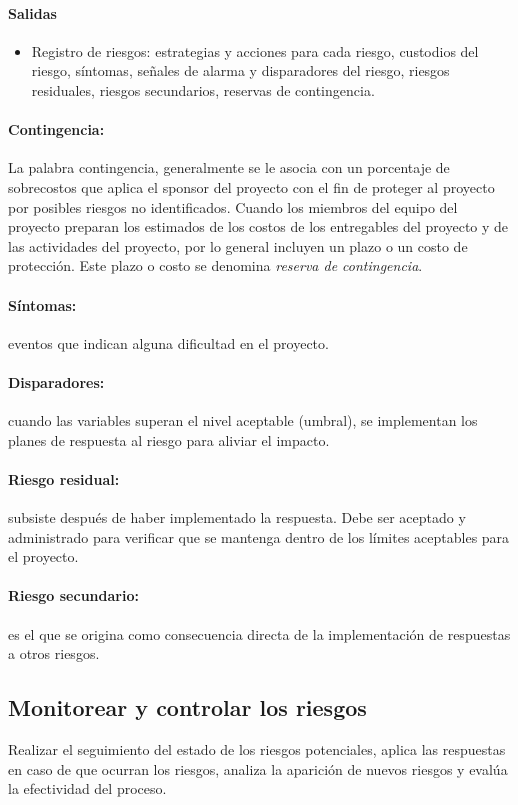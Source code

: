\documentclass[a4paper,twosides]{article}
\newlength{\wideitemsep}
\let\olditem\item
\renewcommand{\item}{\setlength{\itemsep}{\wideitemsep}\olditem}
\begin{document}
\paragraph{Salidas}
\begin{itemize}
\item Registro de riesgos: estrategias y acciones para cada riesgo, custodios del riesgo, síntomas, señales de alarma y disparadores del riesgo, riesgos residuales, riesgos secundarios, reservas de contingencia.
\end{itemize}

\paragraph{Contingencia:} La palabra contingencia, generalmente se le asocia con un porcentaje de sobrecostos que aplica el sponsor del proyecto con el fin de proteger al proyecto por posibles riesgos no identificados. Cuando los miembros del equipo del proyecto preparan los estimados de los costos de los entregables del proyecto y de las actividades del proyecto, por lo general incluyen un plazo o un costo de protección. Este plazo o costo se denomina \emph{reserva de contingencia}.


\paragraph{Síntomas:} eventos que indican alguna dificultad en el proyecto.
\paragraph{Disparadores:} cuando las variables superan el nivel aceptable (umbral), se implementan los planes de respuesta al riesgo para aliviar el impacto.
\paragraph{Riesgo residual:} subsiste después de haber implementado la respuesta. Debe ser aceptado y administrado para verificar que se mantenga dentro de los límites aceptables para el proyecto.
\paragraph{Riesgo secundario:} es el que se origina como consecuencia directa de la implementación de respuestas a otros riesgos.
\subsection{Monitorear y controlar los riesgos} \label{sec:controlar_riesgos}
Realizar el seguimiento del estado de los riesgos potenciales, aplica las respuestas en caso de que ocurran los riesgos, analiza la aparición de nuevos riesgos y evalúa la efectividad del proceso.
\end{document}
